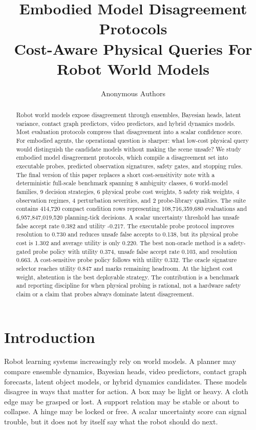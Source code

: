 \documentclass{article}
\title{Embodied Model Disagreement Protocols\\Cost-Aware Physical Queries For Robot World Models}
\author{Anonymous Authors}
\begin{document}
\maketitle

\begin{abstract}
Robot world models expose disagreement through ensembles, Bayesian heads, latent variance, contact graph predictors, video predictors, and hybrid dynamics models. Most evaluation protocols compress that disagreement into a scalar confidence score. For embodied agents, the operational question is sharper: what low-cost physical query would distinguish the candidate models without making the scene unsafe? We study embodied model disagreement protocols, which compile a disagreement set into executable probes, predicted observation signatures, safety gates, and stopping rules. The final version of this paper replaces a short cost-sensitivity note with a deterministic full-scale benchmark spanning 8 ambiguity classes, 6 world-model families, 9 decision strategies, 6 physical probe cost weights, 5 safety risk weights, 4 observation regimes, 4 perturbation severities, and 2 probe-library qualities. The suite contains 414,720 compact condition rows representing 108,716,359,680 evaluations and 6,957,847,019,520 planning-tick decisions. A scalar uncertainty threshold has unsafe false accept rate 0.382 and utility -0.217. The executable probe protocol improves resolution to 0.730 and reduces unsafe false accepts to 0.138, but its physical probe cost is 1.302 and average utility is only 0.220. The best non-oracle method is a safety-gated probe policy with utility 0.374, unsafe false accept rate 0.103, and resolution 0.663. A cost-sensitive probe policy follows with utility 0.332. The oracle signature selector reaches utility 0.847 and marks remaining headroom. At the highest cost weight, abstention is the best deployable strategy. The contribution is a benchmark and reporting discipline for when physical probing is rational, not a hardware safety claim or a claim that probes always dominate latent disagreement.
\end{abstract}

\section{Introduction}

Robot learning systems increasingly rely on world models. A planner may compare ensemble dynamics, Bayesian heads, video predictors, contact graph forecasts, latent object models, or hybrid dynamics candidates. These models disagree in ways that matter for action. A box may be light or heavy. A cloth edge may be grasped or lost. A support relation may be stable or about to collapse. A hinge may be locked or free. A scalar uncertainty score can signal trouble, but it does not by itself say what the robot should do next.
\end{document}
